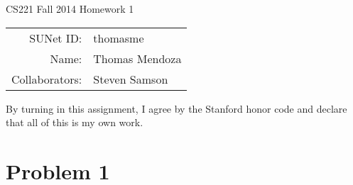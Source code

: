 \documentclass[12pt]{article}
\begin{document}
\begin{center}
{\Large CS221 Fall 2014 Homework 1}

\begin{tabular}{rl}
SUNet ID: & thomasme \\
Name: & Thomas Mendoza \\
Collaborators: & Steven Samson
\end{tabular}
\end{center}

By turning in this assignment, I agree by the Stanford honor code and declare
that all of this is my own work.

\section*{Problem 1}
\end{document}
